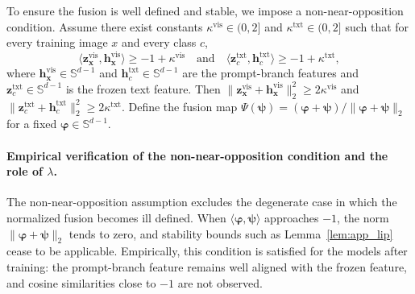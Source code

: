 \documentclass{article}
\theoremstyle{plain}
\theoremstyle{definition}
\theoremstyle{remark}
\begin{document}
	To ensure the fusion is well defined and stable, we impose a non-near-opposition condition.
	Assume there exist constants $\kappa^{\mathrm{vis}}\in(0,2]$ and $\kappa^{\mathrm{txt}}\in(0,2]$ such that for every training image $x$ and every class $c$,
	\begin{equation*}
		\bigl\langle \mathbf{z}^{\mathrm{vis}}_{\mathbf{x}},\mathbf{h}^{\mathrm{vis}}_{\mathbf{x}}\bigr\rangle\ge -1+\kappa^{\mathrm{vis}}
		\quad
		\text{and}
		\quad
		\bigl\langle \mathbf{z}^{\mathrm{txt}}_{c},\mathbf{h}^{\mathrm{txt}}_{c}\bigr\rangle\ge -1+\kappa^{\mathrm{txt}},
	\end{equation*}
	where $\mathbf{h}^{\mathrm{vis}}_{\mathbf{x}}\in\mathbb S^{d-1}$ and $\mathbf{h}^{\mathrm{txt}}_{c}\in\mathbb S^{d-1}$ are the prompt-branch features and $\mathbf{z}^{\mathrm{txt}}_{c}\in\mathbb S^{d-1}$ is the frozen text feature.
	Then $\bigl\|\mathbf{z}^{\mathrm{vis}}_{\mathbf{x}}+\mathbf{h}^{\mathrm{vis}}_{\mathbf{x}}\bigr\|_2^2\ge 2\kappa^{\mathrm{vis}}$ and $\bigl\|\mathbf{z}^{\mathrm{txt}}_{c}+\mathbf{h}^{\mathrm{txt}}_{c}\bigr\|_2^2\ge 2\kappa^{\mathrm{txt}}$.
	Define the fusion map $\Psi(\boldsymbol{\psi})=(\boldsymbol{\varphi}+\boldsymbol{\psi})/\|\boldsymbol{\varphi}+\boldsymbol{\psi}\|_2$ for a fixed $\boldsymbol{\varphi}\in\mathbb S^{d-1}$.
	\paragraph{Empirical verification of the non-near-opposition condition and the role of $\lambda$.}
	The non-near-opposition assumption excludes the degenerate case in which the normalized fusion becomes ill defined. When $\langle \boldsymbol{\varphi},\boldsymbol{\psi}\rangle$ approaches $-1$, the norm $\|\boldsymbol{\varphi}+\boldsymbol{\psi}\|_2$ tends to zero, and stability bounds such as Lemma~\ref{lem:app_lip} cease to be applicable. Empirically, this condition is satisfied for the models after training: the prompt-branch feature remains well aligned with the frozen feature, and cosine similarities close to $-1$ are not observed.
	
\end{document}
